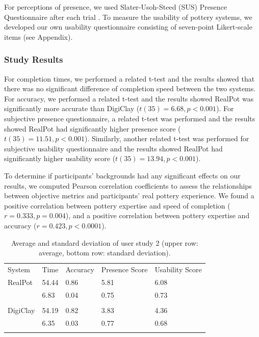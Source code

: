 \documentclass{svjour3}                     %
\begin{document}
For perceptions of presence, we used Slater-Usoh-Steed (SUS) Presence Questionnaire after each trial \cite{slater1994depth}.
To measure the usability of pottery systems, we developed our own usability questionnaire consisting of seven-point Likert-scale items (see Appendix).


\subsubsection{Study Results}

For completion times, we performed a related t-test and the results showed that there was no significant difference of completion speed between the two systems.
For accuracy, we performed a related t-test and the results showed RealPot was significantly more accurate than DigiClay ($t(35) = 6.68, p < 0.001$). 
For subjective presence questionnaire, a related t-test was performed and the results showed RealPot had significantly higher presence score ($t(35) = 11.51, p < 0.001$).
Similarly, another related t-test was performed for subjective usability questionnaire and the results showed RealPot had significantly higher usability score ($t(35) = 13.94, p < 0.001$).

To determine if participants' backgrounds {\color{blue} had} any significant effects on our results, we computed Pearson correlation coefficients to assess the relationships between objective metrics and participants' real pottery experience. We found a positive correlation between pottery expertise and {\color{blue} speed of completion } ($r = 0.333, p = 0.004$), and a positive correlation between pottery expertise and accuracy ($r = 0.423, p < 0.0001$).


\begin{table}
\caption{Average and standard deviation of user study 2 (upper row: average, bottom row: standard deviation).}
\label{tab:r2}       %
\begin{tabular}{lllll}
\hline\noalign{\smallskip}
System & Time & Accuracy & Presence Score & Usability Score\\
\noalign{\smallskip}\hline\noalign{\smallskip}
RealPot 	& 54.44	& 0.86 & 5.81 & 6.08 \\
			& 6.83	& 0.04 & 0.75 & 0.73 \\
\\
DigiClay 	& 54.19	& 0.82 & 3.83 & 4.36 \\
			& 6.35	& 0.03 & 0.77 & 0.68 \\
\noalign{\smallskip}\hline
\end{tabular}
\end{table}
\end{document}

